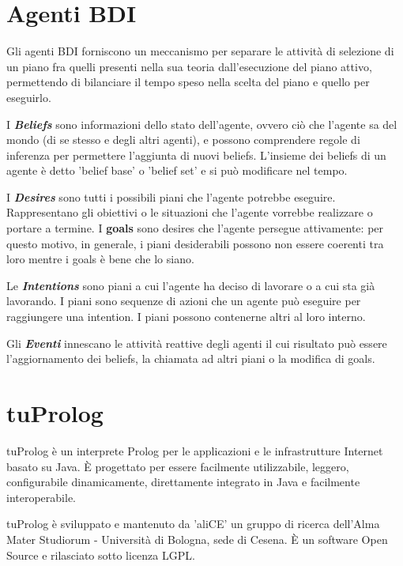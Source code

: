 \documentclass[12pt,a4paper,openright,twoside]{report}
\begin{document}
\section{Agenti BDI}
Gli agenti BDI forniscono un meccanismo per separare le attivit\`a di selezione di un piano fra quelli presenti nella sua teoria dall'esecuzione del piano attivo, permettendo di bilanciare il tempo speso nella scelta del piano e quello per eseguirlo.

I \textbf{\textit{Beliefs}} sono informazioni dello stato dell'agente, ovvero ci\`o che l'agente sa del mondo (di se stesso e degli altri agenti), e possono comprendere regole di inferenza per permettere l'aggiunta di nuovi beliefs. L'insieme dei beliefs di un agente \`e detto 'belief base' o 'belief set' e si pu\`o modificare nel tempo.

I \textbf{\textit{Desires}} sono tutti i possibili piani che l'agente potrebbe eseguire. Rappresentano gli obiettivi o le situazioni che l'agente vorrebbe realizzare o portare a termine. I \textbf{goals} sono desires che l'agente persegue attivamente: per questo motivo, in generale, i piani desiderabili possono non essere coerenti tra loro mentre i goals \`e bene che lo siano.

Le \textbf{\textit{Intentions}} sono piani a cui l'agente ha deciso di lavorare o a cui sta gi\`a lavorando. I piani sono sequenze di azioni che un agente pu\`o eseguire per raggiungere una intention. I piani possono contenerne altri al loro interno.

Gli \textbf{\textit{Eventi}} innescano le attivit\`a reattive degli agenti il cui risultato pu\`o essere l'aggiornamento dei beliefs, la chiamata ad altri piani o la modifica di goals.

\section{tuProlog}
tuProlog \`e un interprete Prolog per le applicazioni e le infrastrutture Internet basato su Java. \`E progettato per essere facilmente utilizzabile, leggero, configurabile dinamicamente, direttamente integrato in Java e facilmente interoperabile.

tuProlog \`e sviluppato e mantenuto da 'aliCE' un gruppo di ricerca dell'Alma Mater Studiorum - Universit\`a di Bologna, sede di Cesena. \`E un software Open Source e rilasciato sotto licenza LGPL.
\end{document}

